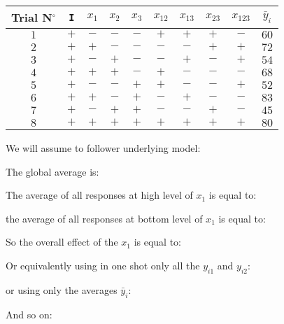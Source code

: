 	\begin{table}[H]\centering
	\begin{center}
			\begin{tabular}{|c|c|c|c|c|c|c|c|c|c|}
				\hline
				\multicolumn{1}{c}{\cellcolor{black!30}\textbf{Trial N${}^\circ$}} & 
  \multicolumn{1}{c}{\cellcolor{black!30}\texttt{I}} &
  \multicolumn{1}{c}{\cellcolor{black!30}$x_1$} & 
  \multicolumn{1}{c}{\cellcolor{black!30}$x_2$} & 
  \multicolumn{1}{c}{\cellcolor{black!30}$x_3$} &
  \multicolumn{1}{c}{\cellcolor{black!30}$x_{12}$} & 
  \multicolumn{1}{c}{\cellcolor{black!30}$x_{13}$} & 
  \multicolumn{1}{c}{\cellcolor{black!30}$x_{23}$} & 
  \multicolumn{1}{c}{\cellcolor{black!30}$x_{123}$} &  
  \multicolumn{1}{c}{\cellcolor{black!30}$\bar{y}_i$}\\ \hline
				 $1$ & $+$ & $-$ & $-$ & $-$ & $+$ & $+$ & $+$ & $-$ & $60$\\ \hline
				 $2$ & $+$ & $+$ & $-$ & $-$ & $-$ & $-$ & $+$ & $+$ & $72$\\ \hline
				 $3$ & $+$ & $-$ & $+$ & $-$ & $-$ & $+$ & $-$ & $+$ & $54$\\ \hline
				 $4$ & $+$ & $+$ & $+$ & $-$ & $+$ & $-$ & $-$ & $-$ & $68$\\ \hline
				 $5$ & $+$ & $-$ & $-$ & $+$ & $+$ & $-$ & $-$ & $+$ & $52$\\ \hline
				 $6$ & $+$ & $+$ & $-$ & $+$ & $-$ & $+$ & $-$ & $-$ & $83$\\ \hline
				 $7$ & $+$ & $-$ & $+$ & $+$ & $-$ & $-$ & $+$ & $-$ & $45$\\ \hline
				 $8$ & $+$ & $+$ & $+$ & $+$ & $+$ & $+$ & $+$ & $+$ & $80$\\ \hline
		\end{tabular}
	\end{center}
	\end{table}	
	We will assume to follower underlying model:
	
	The global average is:
	
	The average of all responses at high level of $x_1$ is equal to:
	
	the average of all responses at bottom level of $x_1$ is equal to:
	
	So the overall effect of the $x_1$ is equal to:
	
	Or equivalently using in one shot only all the $y_{i1}$ and $y_{i2}$:
	
	or using only the averages $\bar{y}_i$:
	
	And so on:
	
